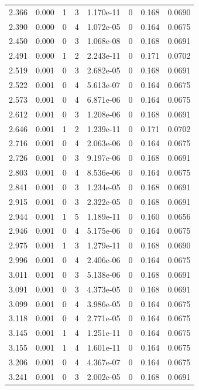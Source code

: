 \documentclass[preview]{standalone}
\begin{document}
{{{\begin{tabular}{L{1.2cm}C{1.2cm} C{0.3cm}C{0.5cm} C{1.4cm}C{1.4cm} C{1.4cm}C{1.4cm}}
  2.366  &  0.000  & 1     &  3 &  1.170e-11  & 0  & 0.168 &  0.0690   \\ 
  2.390  &  0.000  & 0     &  4 &  1.072e-05  & 0  & 0.164 &  0.0675   \\ 
  2.450  &  0.000  & 0     &  3 &  1.068e-08  & 0  & 0.168 &  0.0691   \\ 
  2.491  &  0.000  & 1     &  2 &  2.243e-11  & 0  & 0.171 &  0.0702   \\ 
  2.519  &  0.001  & 0     &  3 &  2.682e-05  & 0  & 0.168 &  0.0691   \\ 
  2.522  &  0.001  & 0     &  4 &  5.613e-07  & 0  & 0.164 &  0.0675   \\ 
  2.573  &  0.001  & 0     &  4 &  6.871e-06  & 0  & 0.164 &  0.0675   \\ 
  2.612  &  0.001  & 0     &  3 &  1.208e-06  & 0  & 0.168 &  0.0691   \\ 
  2.646  &  0.001  & 1     &  2 &  1.239e-11  & 0  & 0.171 &  0.0702   \\ 
  2.716  &  0.001  & 0     &  4 &  2.063e-06  & 0  & 0.164 &  0.0675   \\ 
  2.726  &  0.001  & 0     &  3 &  9.197e-06  & 0  & 0.168 &  0.0691   \\ 
  2.803  &  0.001  & 0     &  4 &  8.536e-06  & 0  & 0.164 &  0.0675   \\ 
  2.841  &  0.001  & 0     &  3 &  1.234e-05  & 0  & 0.168 &  0.0691   \\ 
  2.915  &  0.001  & 0     &  3 &  2.322e-05  & 0  & 0.168 &  0.0691   \\ 
  2.944  &  0.001  & 1     &  5 &  1.189e-11  & 0  & 0.160 &  0.0656   \\ 
  2.946  &  0.001  & 0     &  4 &  5.175e-06  & 0  & 0.164 &  0.0675   \\ 
  2.975  &  0.001  & 1     &  3 &  1.279e-11  & 0  & 0.168 &  0.0690   \\ 
  2.996  &  0.001  & 0     &  4 &  2.406e-06  & 0  & 0.164 &  0.0675   \\ 
  3.011  &  0.001  & 0     &  3 &  5.138e-06  & 0  & 0.168 &  0.0691   \\ 
  3.091  &  0.001  & 0     &  3 &  4.373e-05  & 0  & 0.168 &  0.0691   \\ 
  3.099  &  0.001  & 0     &  4 &  3.986e-05  & 0  & 0.164 &  0.0675   \\ 
  3.118  &  0.001  & 0     &  4 &  2.771e-05  & 0  & 0.164 &  0.0675   \\ 
  3.145  &  0.001  & 1     &  4 &  1.251e-11  & 0  & 0.164 &  0.0675   \\ 
  3.155  &  0.001  & 1     &  4 &  1.601e-11  & 0  & 0.164 &  0.0675   \\ 
  3.206  &  0.001  & 0     &  4 &  4.367e-07  & 0  & 0.164 &  0.0675   \\ 
  3.241  &  0.001  & 0     &  3 &  2.002e-05  & 0  & 0.168 &  0.0691   \\ 
\hline 
\end{tabular} 

}}}
\end{document}
